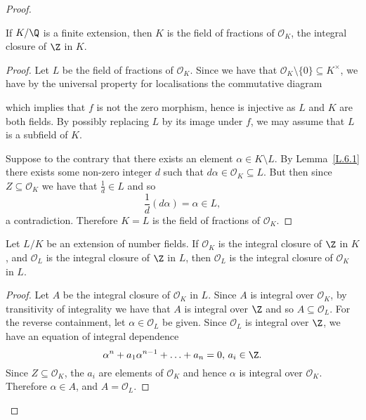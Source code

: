 \documentclass[10pt]{amsart}
\begin{document}
\begin{thm}
\begin{proof}
		\begin{lem}\label{L.6.5}
			If $K/\Q$ is a finite extension, then $K$ is the field of fractions of $\mathcal{O}_K$, the integral closure of $\Z$ in $K$.
			\begin{proof}
				Let $L$ be the field of fractions of $\mathcal{O}_K$.
				Since we have that $\mathcal{O}_K\setminus\{0\} \subseteq K^\times$, we have by the universal property for localisations the commutative diagram
				\begin{center}
				\end{center}
				which implies that $f$ is not the zero morphism, hence is injective as $L$ and $K$ are both fields.
				By possibly replacing $L$ by its image under $f$, we may assume that $L$ is a subfield of $K$.
				
				Suppose to the contrary that there exists an element $\alpha \in K \setminus L$.
				By Lemma~\ref{L.6.1} there exists some non-zero integer $d$ such that $d\alpha \in \mathcal{O}_K \subseteq L$.
				But then since $Z \subseteq \mathcal{O}_K$ we have that $\frac{1}{d} \in L$ and so
				$$\frac{1}{d}(d\alpha) = \alpha \in L,$$
				a contradiction.
				Therefore $K = L$ is the field of fractions of $\mathcal{O}_K$.
			\end{proof}
		\end{lem}

		\begin{lem}\label{L.6.6}
			Let $L/K$ be an extension of number fields.
			If $\mathcal{O}_K$ is the integral closure of $\Z$ in $K$, and $\mathcal{O}_L$ is the integral closure of $\Z$ in $L$, then $\mathcal{O}_L$ is the integral closure of $\mathcal{O}_K$ in $L$.

			\begin{proof}
				Let $A$ be the integral closure of $\mathcal{O}_K$ in $L$.
				Since $A$ is integral over $\mathcal{O}_K$, by transitivity of integrality we have that $A$ is integral over $\Z$ and so $A \subseteq \mathcal{O}_L$.
				For the reverse containment, let $\alpha \in \mathcal{O}_L$ be given.
				Since $\mathcal{O}_L$ is integral over $\Z$, we have an equation of integral dependence
				$$\alpha^n + a_1\alpha^{n-1} + \ldots + a_n = 0,\, a_i \in \Z.$$
				Since $Z \subseteq \mathcal{O}_K$, the $a_i$ are elements of $\mathcal{O}_K$ and hence $\alpha$ is integral over $\mathcal{O}_K$.
				Therefore $\alpha \in A$, and $A = \mathcal{O}_L$.
			\end{proof}
		\end{lem}
	

\end{proof}
\end{thm}
\end{document}
